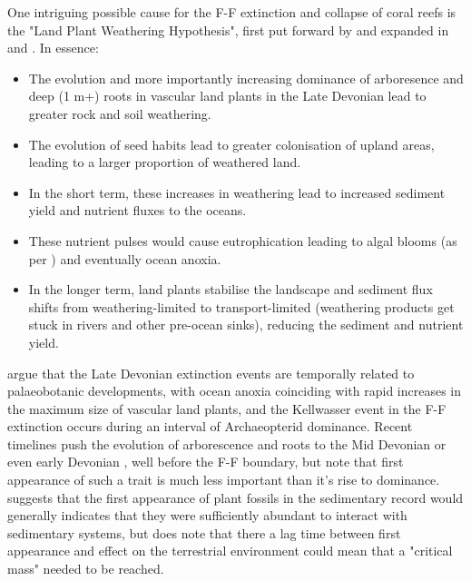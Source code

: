 \documentclass[11pt,a4paper]{article}
\begin{document}
One intriguing possible cause for the F-F extinction and collapse of coral reefs is the "Land Plant Weathering Hypothesis", first put forward by \cite{Algeo1995} and expanded in \cite{Algeo1998} and \cite{Algeo2010}. In essence:

\begin{itemize}
  \item The evolution and more importantly increasing dominance of arboresence and deep (1 m+) roots in vascular land plants in the Late Devonian lead to greater rock and soil weathering. 
  \item The evolution of seed habits lead to greater colonisation of upland areas, leading to a larger proportion of weathered land.
  \item In the short term, these increases in weathering lead to increased sediment yield and nutrient fluxes to the oceans. 
  \item These nutrient pulses would cause eutrophication leading to algal blooms (as per \cite{WuFengGong2013}) and eventually ocean anoxia.
  \item In the longer term, land plants stabilise the landscape and sediment flux shifts from weathering-limited to transport-limited (weathering products get stuck in rivers and other pre-ocean sinks), reducing the sediment and nutrient yield.
\end{itemize}


\cite{Algeo1995} argue that the Late Devonian extinction events are temporally related to palaeobotanic developments, with ocean anoxia coinciding with rapid increases in the maximum size of vascular land plants, and the Kellwasser event in the F-F extinction occurs during an interval of Archaeopterid dominance. Recent timelines push the evolution of arborescence and roots to the Mid Devonian or even early Devonian \citep{Hetherington2018}, well before the F-F boundary, but \cite{Algeo1995} note that first appearance of such a trait is much less important than it's rise to dominance. 
\cite{Davies2010} suggests that the first appearance of plant fossils in the sedimentary record would generally indicates that they were sufficiently abundant to interact with sedimentary systems, but does note that there a lag time between first appearance and effect on the terrestrial environment could mean that a "critical mass" needed to be reached.
\end{document}
